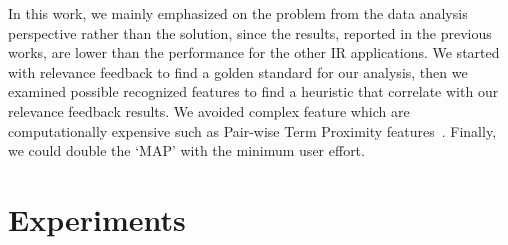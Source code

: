 \documentclass{sig-alternate}
\begin{document}


 
In this work, we mainly emphasized on the problem from the data analysis perspective rather than the solution, since the results, reported in the previous works, are lower than the performance for the other IR applications. We started with relevance feedback to find a golden standard for our analysis, then we examined possible recognized features to find a heuristic that correlate with our relevance feedback results. We avoided complex feature which are computationally expensive such as Pair-wise Term Proximity features~\cite{bashir2010improving}. Finally, we could double the `MAP' with the minimum user effort. 
\section{Experiments}
\end{document}
